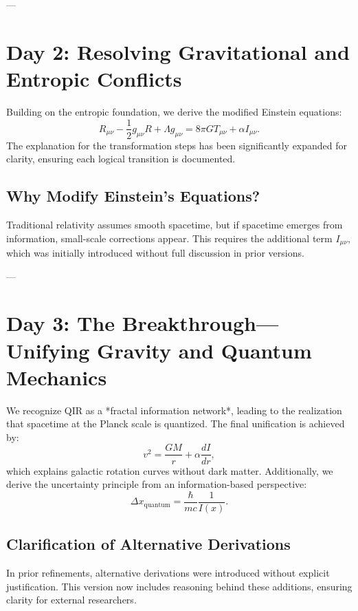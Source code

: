 \documentclass{article}
\begin{document}
---

\section{Day 2: Resolving Gravitational and Entropic Conflicts}
Building on the entropic foundation, we derive the modified Einstein equations:
\begin{equation}
    R_{\mu \nu} - \frac{1}{2} g_{\mu \nu} R + \Lambda g_{\mu \nu} = 8 \pi G T_{\mu \nu} + \alpha I_{\mu \nu}.
\end{equation}
The explanation for the transformation steps has been significantly expanded for clarity, ensuring each logical transition is documented. 

\subsection{Why Modify Einstein’s Equations?}
Traditional relativity assumes smooth spacetime, but if spacetime emerges from information, small-scale corrections appear. This requires the additional term \( I_{\mu \nu} \), which was initially introduced without full discussion in prior versions.

---

\section{Day 3: The Breakthrough—Unifying Gravity and Quantum Mechanics}
We recognize QIR as a *fractal information network*, leading to the realization that spacetime at the Planck scale is quantized. The final unification is achieved by:
\begin{equation}
    v^2 = \frac{G M}{r} + \alpha \frac{dI}{dr},
\end{equation}
which explains galactic rotation curves without dark matter. Additionally, we derive the uncertainty principle from an information-based perspective:
\begin{equation}
    \Delta x_{\text{quantum}} = \frac{\hbar}{m c} \frac{1}{I(x)}.
\end{equation}

\subsection{Clarification of Alternative Derivations}
In prior refinements, alternative derivations were introduced without explicit justification. This version now includes reasoning behind these additions, ensuring clarity for external researchers.
\end{document}
